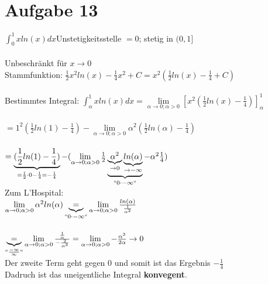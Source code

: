\documentclass[12pt,a4paper]{article}
\begin{document}
\section*{Aufgabe 13}
$\int_0^1xln(x)dx$\quad Unstetigkeitsstelle $=0$; stetig in $(0,1]$\\
\\
Unbeschränkt für $x\rightarrow 0$
\\
Stammfunktion: $\frac{1}{2}x^2ln(x)-\frac{1}{4}x^2+C=x^2(\frac{1}{2}ln(x)-\frac{1}{4}+C)$\\
\\
Bestimmtes Integral: $\int_\alpha^1xln(x)dx = \lim \limits_{\alpha\rightarrow 0; \alpha > 0}\left[x^2(\frac{1}{2}ln(x)-\frac{1}{4})\right]_\alpha^1$\\
\\
$=1^2(\frac{1}{2}ln(1)-\frac{1}{4})-\lim \limits_{\alpha\rightarrow 0; \alpha > 0}\alpha^2(\frac{1}{2}ln(\alpha)-\frac{1}{4})$\\
\\
$=\underbrace{(\frac{1}{2}ln(1)-\frac{1}{4})}_{=\frac{1}{2}\cdot 0-\frac{1}{4}=-\frac{1}{4}}-(\lim \limits_{\alpha\rightarrow 0; \alpha > 0}\frac{1}{2}\underbrace{\underbrace{\alpha^2}_{\rightarrow 0}\underbrace{ln(\alpha)}_{\rightarrow -\infty}}_{``0\cdot -\infty``}-\alpha^2\frac{1}{4})$
\\
Zum L'Hospital:\\
$\lim \limits_{\alpha\rightarrow 0; \alpha > 0}\alpha^2ln(\alpha)\underbrace{=}_{``0\cdot -\infty``}\lim \limits_{\alpha\rightarrow 0; \alpha > 0}\frac{ln(\alpha)}{\frac{1}{\alpha^2}}$\\
\\
$\underbrace{=}_{``\frac{-\infty}{\infty}``}\lim \limits_{\alpha\rightarrow 0; \alpha > 0}\frac{\frac{1}{\alpha}}{-\frac{2}{\alpha^3}}=\lim \limits_{\alpha\rightarrow 0; \alpha > 0}-\frac{\alpha^3}{2\alpha}\rightarrow 0$\
\\
Der zweite Term geht gegen $0$ und somit ist das Ergebnis $-\frac{1}{4}$\\
Dadruch ist das uneigentliche Integral \textbf{konvegent}.\\
\\
\newpage
\end{document}
